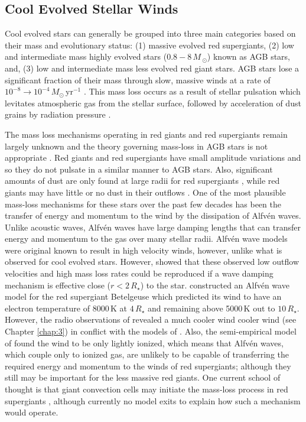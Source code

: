 \subsection{Cool Evolved Stellar Winds}\label{sec:1.4.3}
Cool evolved stars can generally be grouped into three main categories based on their mass and evolutionary status: (1) massive evolved red supergiants, (2) low and intermediate mass highly evolved stars ($0.8 - 8\,M\,_{\odot}$) known as AGB stars, and, (3) low and intermediate mass less evolved red giant stars. AGB stars lose a significant fraction of their mass through slow, massive winds at a rate of $10^{-8} \rightarrow 10^{-4}\,M_{\odot}$\,yr$^{-1}$ \citep{van_loon_2005}. This mass loss occurs as a result of stellar pulsation \citep{habing_1996} which levitates atmospheric gas from the stellar surface, followed by acceleration of dust grains by radiation pressure \citep{gehrz_1971}. 

The mass loss mechanisms operating in red giants and red supergiants remain largely unknown and the theory governing mass-loss in AGB stars is not appropriate \citep{josselin_2007}. Red giants and red supergiants have small amplitude variations and so they do not pulsate in a similar manner to AGB stars. Also, significant amounts of dust are only found at large radii for red supergiants \citep{danchi_1994}, while red giants may have little or no dust in their outflows \citep{jones_2008}. One of the most plausible mass-loss mechanisms for these stars over the past few decades has been the transfer of energy and momentum to the wind by the dissipation of Alfv\'en waves. Unlike acoustic waves, Alfv\'en waves have large damping lengths that can transfer energy and momentum to the gas over many stellar radii. Alfv\'en wave models were original known to result in high velocity winds, however, unlike what is observed for cool evolved stars. However, \cite{hartmann_1980} showed that these observed low outflow velocities and high mass loss rates could be reproduced if a wave damping mechanism is effective close ($r < 2\,R_{\star}$) to the star. \cite{hartmann_1984} constructed an Alfv\'en wave model for the red supergiant Betelgeuse which predicted its wind to have an electron temperature of 8000\,K at $4\,R_{\star}$ and remaining above 5000\,K out to $10\,R_{\star}$. However, the radio observations of \cite{lim_1998} revealed a much cooler wind cooler wind (see Chapter \ref{chap:3}) in conflict with the models of \cite{hartmann_1984}. Also, the semi-empirical model of \cite{harper_2001} found the wind to be only lightly ionized, which means that Alfv\'en waves, which couple only to ionized gas, are unlikely to be capable of transferring the required energy and momentum to the winds of red supergiants; although they still may be important for the less massive red giants. One current school of thought is that giant convection cells may initiate the mass-loss process in red supergiants \cite[e.g.,][]{lim_1998}, although currently no model exits to explain how such a mechanism would operate.

